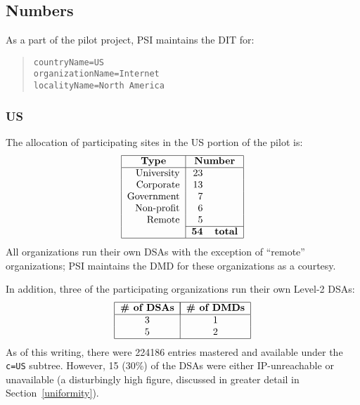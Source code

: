\newpage	
\subsection	{Numbers}
As a part of the pilot project,
PSI maintains the DIT for:
\begin{quote}\small\begin{verbatim}
countryName=US
organizationName=Internet
localityName=North America
\end{verbatim}\end{quote}

\subsubsection	{US}
The allocation of participating sites in the US portion of the pilot is:
\[\begin{tabular}{|r|rl|}
\hline
\multicolumn{1}{|c|}{\bf Type}&
			\multicolumn{2}{c|}{\bf Number}\\
\hline
University&		23&	\\
Corporate&		13&	\\
Government&		 7&	\\
Non-profit&		 6&	\\
Remote&			 5&	\\
\cline{2-3}
&			\bf 54&	\bf total\\
\hline
\end{tabular}\]
All organizations run their own DSAs with the exception of ``remote''
organizations;
PSI maintains the DMD for these organizations as a courtesy.

In addition,
three of the participating organizations run their own Level-2 DSAs:
\[\begin{tabular}{|c|c|}
\hline
\multicolumn{1}{|c|}{\bf \# of DSAs}&
			\multicolumn{1}{|c|}{\bf \# of DMDs}\\
\hline
3&		1\\
5&		2\\
\hline
\end{tabular}\]
As of this writing,
there were 224186 entries mastered and available under the \verb"c=US" subtree.
However,
15 (30\%) of the DSAs were either IP-unreachable or unavailable
(a disturbingly high figure, discussed in greater detail in
Section~\ref{uniformity}).

\newpage	%
